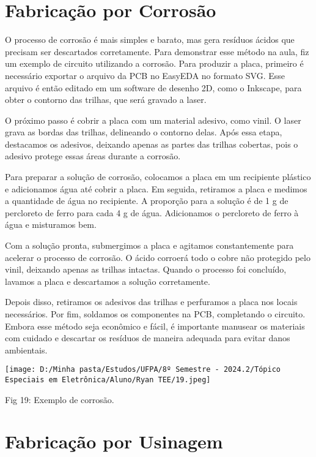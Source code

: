 \documentclass[
]{book}
\begin{document}
\section{Fabricação por Corrosão}\label{fabricauxe7uxe3o-por-corrosuxe3o}

O processo de corrosão é mais simples e barato, mas gera resíduos ácidos que precisam ser descartados corretamente. Para demonstrar esse método na aula, fiz um exemplo de circuito utilizando a corrosão. Para produzir a placa, primeiro é necessário exportar o arquivo da PCB no EasyEDA no formato SVG. Esse arquivo é então editado em um software de desenho 2D, como o Inkscape, para obter o contorno das trilhas, que será gravado a laser.

O próximo passo é cobrir a placa com um material adesivo, como vinil. O laser grava as bordas das trilhas, delineando o contorno delas. Após essa etapa, destacamos os adesivos, deixando apenas as partes das trilhas cobertas, pois o adesivo protege essas áreas durante a corrosão.

Para preparar a solução de corrosão, colocamos a placa em um recipiente plástico e adicionamos água até cobrir a placa. Em seguida, retiramos a placa e medimos a quantidade de água no recipiente. A proporção para a solução é de 1 g de percloreto de ferro para cada 4 g de água. Adicionamos o percloreto de ferro à água e misturamos bem.

Com a solução pronta, submergimos a placa e agitamos constantemente para acelerar o processo de corrosão. O ácido corroerá todo o cobre não protegido pelo vinil, deixando apenas as trilhas intactas. Quando o processo foi concluído, lavamos a placa e descartamos a solução corretamente.

Depois disso, retiramos os adesivos das trilhas e perfuramos a placa nos locais necessários. Por fim, soldamos os componentes na PCB, completando o circuito. Embora esse método seja econômico e fácil, é importante manusear os materiais com cuidado e descartar os resíduos de maneira adequada para evitar danos ambientais.

\texttt{[image: D:/Minha pasta/Estudos/UFPA/8º Semestre - 2024.2/Tópico Especiais em Eletrônica/Aluno/Ryan TEE/19.jpeg]}

Fig 19: Exemplo de corrosão.

\section{Fabricação por Usinagem}\label{fabricauxe7uxe3o-por-usinagem}
\end{document}
